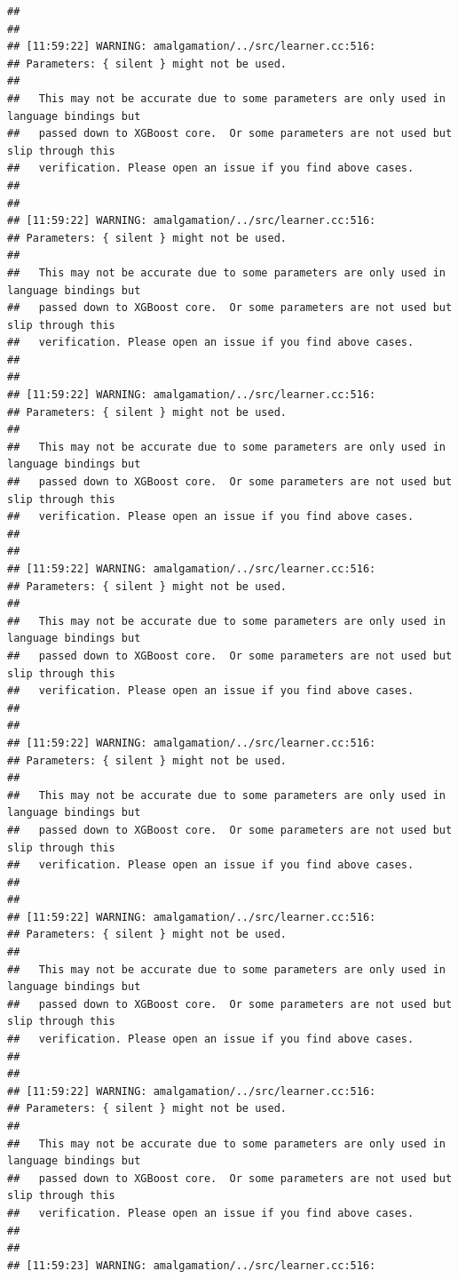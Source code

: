 \documentclass[AMS,STIX2COL]{WileyNJD-v2}\usepackage[]{graphicx}\usepackage[]{color}
\makeatletter
\newenvironment{kframe}{%
 \def\at@end@of@kframe{}%
 \ifinner\ifhmode%
  \def\at@end@of@kframe{\end{minipage}}%
  \begin{minipage}{\columnwidth}%
 \fi\fi%
 \def\FrameCommand##1{\hskip\@totalleftmargin \hskip-\fboxsep
 \colorbox{shadecolor}{##1}\hskip-\fboxsep
     \hskip-\linewidth \hskip-\@totalleftmargin \hskip\columnwidth}%
 \MakeFramed {\advance\hsize-\width
   \@totalleftmargin\z@ \linewidth\hsize
   \@setminipage}}%
 {\par\unskip\endMakeFramed%
 \at@end@of@kframe}
\newenvironment{knitrout}{}{} %
\makeatother
\begin{document}
\begin{knitrout}
\begin{kframe}
\begin{verbatim}
## 
## 
## [11:59:22] WARNING: amalgamation/../src/learner.cc:516: 
## Parameters: { silent } might not be used.
## 
##   This may not be accurate due to some parameters are only used in language bindings but
##   passed down to XGBoost core.  Or some parameters are not used but slip through this
##   verification. Please open an issue if you find above cases.
## 
## 
## [11:59:22] WARNING: amalgamation/../src/learner.cc:516: 
## Parameters: { silent } might not be used.
## 
##   This may not be accurate due to some parameters are only used in language bindings but
##   passed down to XGBoost core.  Or some parameters are not used but slip through this
##   verification. Please open an issue if you find above cases.
## 
## 
## [11:59:22] WARNING: amalgamation/../src/learner.cc:516: 
## Parameters: { silent } might not be used.
## 
##   This may not be accurate due to some parameters are only used in language bindings but
##   passed down to XGBoost core.  Or some parameters are not used but slip through this
##   verification. Please open an issue if you find above cases.
## 
## 
## [11:59:22] WARNING: amalgamation/../src/learner.cc:516: 
## Parameters: { silent } might not be used.
## 
##   This may not be accurate due to some parameters are only used in language bindings but
##   passed down to XGBoost core.  Or some parameters are not used but slip through this
##   verification. Please open an issue if you find above cases.
## 
## 
## [11:59:22] WARNING: amalgamation/../src/learner.cc:516: 
## Parameters: { silent } might not be used.
## 
##   This may not be accurate due to some parameters are only used in language bindings but
##   passed down to XGBoost core.  Or some parameters are not used but slip through this
##   verification. Please open an issue if you find above cases.
## 
## 
## [11:59:22] WARNING: amalgamation/../src/learner.cc:516: 
## Parameters: { silent } might not be used.
## 
##   This may not be accurate due to some parameters are only used in language bindings but
##   passed down to XGBoost core.  Or some parameters are not used but slip through this
##   verification. Please open an issue if you find above cases.
## 
## 
## [11:59:22] WARNING: amalgamation/../src/learner.cc:516: 
## Parameters: { silent } might not be used.
## 
##   This may not be accurate due to some parameters are only used in language bindings but
##   passed down to XGBoost core.  Or some parameters are not used but slip through this
##   verification. Please open an issue if you find above cases.
## 
## 
## [11:59:23] WARNING: amalgamation/../src/learner.cc:516: 

\end{verbatim}
\end{kframe}
\end{knitrout}
\end{document}
